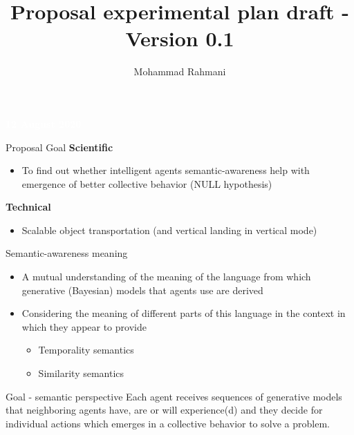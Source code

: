 \documentclass[unknownkeysallowed]{beamer}
\title{Proposal experimental plan draft - Version 0.1}
\author{Mohammad Rahmani}
\institute{DECIDE Doctoral School}
\begin{document}
	\begin{frame}
		\date{}
		\maketitle
		\textcolor{white}{\textbf{12 August 2020}}
	\end{frame}

	\begin{frame}{Proposal Goal}
		\textbf{Scientific}
		\begin{itemize}
			\item To find out whether intelligent agents semantic-awareness help with emergence of better collective behavior (NULL hypothesis)
		\end{itemize}
		
		\textbf{Technical}
		\begin{itemize}
			\item Scalable object transportation (and vertical landing in vertical mode)
		\end{itemize}
	\end{frame}

	\begin{frame}{Semantic-awareness meaning}
		\begin{itemize}
			\item A mutual understanding of the meaning of the language from which generative (Bayesian) models that agents use are derived
			\item Considering the meaning of different parts of this language in the context in which they appear to provide
				\begin{itemize}
					\item Temporality semantics
					\item Similarity semantics
				\end{itemize}
		\end{itemize}
	\end{frame}

	\begin{frame}{Goal - semantic perspective}
		Each agent receives sequences of generative models that neighboring agents have, are or will experience(d) and they decide for individual actions which emerges in a collective behavior to solve a problem.
	\end{frame}
	
\end{document}
